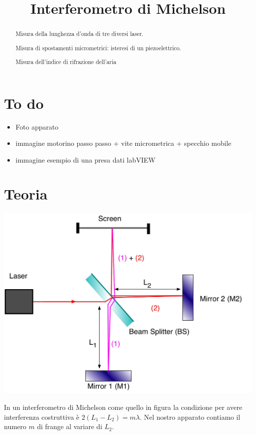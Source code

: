 \documentclass[a4paper]{article}
\begin{document}
	\title{Interferometro di Michelson}
	\maketitle
	
	\section*{To do}
	\begin{itemize}
		\item Foto apparato
		\item immagine motorino passo passo + vite micrometrica + specchio mobile
		\item immagine esempio di una presa dati labVIEW
	\end{itemize}
	
	
	\begin{abstract}
		 Misura della lunghezza d'onda di tre diversi laser.
		 
		 Misura di spostamenti micrometrici: isteresi di un piezoelettrico.
		 
		 Misura dell'indice di rifrazione dell'aria
	\end{abstract}

\section{Teoria}
\begin{center}
	\begin{minipage}[c]{.50\textwidth}
		\centering
		\includegraphics[width=1\textwidth]{michelson.png}
	\end{minipage}
	\begin{minipage}[c]{.40\textwidth}
		In un interferometro di Michelson come quello in figura la condizione per avere interferenza costruttiva è $2(L_1 -L_2) = m \lambda$. Nel nostro apparato contiamo il numero $m$ di frange al variare di $L_2$. 
	\end{minipage}
\end{center}
\end{document}
